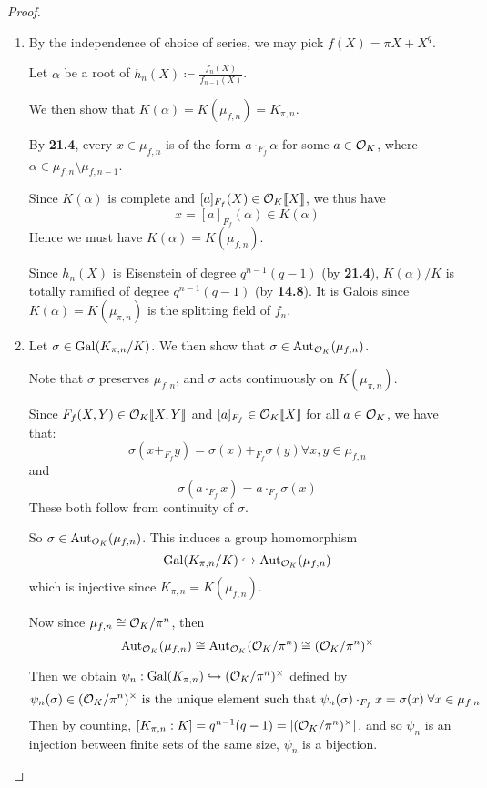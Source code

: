 \documentclass[10pt,a4paper]{article}
\begin{document}
\begin{proof}\hspace*{0cm}
  \begin{enumerate}
    \item By the independence of choice of series, we may pick $f(X) = \pi X + X^q$.

    Let $\alpha$ be a root of $h_n(X) \coloneqq \frac{f_n(X)}{f_{n-1}(X)}$.

    We then show that $K(\alpha) = K(\mu_{f,n}) = K_{\pi,n}$.

    By \textbf{21.4}, every $x \in \mu_{f,n}$ is of the form $a \cdot_{F_f}\alpha$ for some $a \in \mathcal{O}_K$, where $\alpha \in \mu_{f,n}\setminus \mu_{f,n-1}$.

    Since $K(\alpha)$ is complete and $[a]_{F_f}(X) \in \mathcal{O}_K\llbracket X\rrbracket$, we thus have
    \[x = [a]_{F_f}(\alpha) \in K(\alpha)\]
    Hence we must have $K(\alpha) = K(\mu_{f,n})$.

    Since $h_n(X)$ is Eisenstein of degree $q^{n-1}(q-1)$ (by \textbf{21.4}), $K(\alpha)/K$ is totally ramified of degree $q^{n-1}(q-1)$ (by \textbf{14.8}). It is Galois since $K(\alpha) = K(\mu_{\pi,n})$ is the splitting field of $f_n$.

    \item Let $\sigma \in \operatorname{Gal}(K_{\pi,n}/K)$. We then show that $\sigma \in \operatorname{Aut}_{\mathcal{O}_K}(\mu_{f,n})$.

    Note that $\sigma$ preserves $\mu_{f,n}$, and $\sigma$ acts continuously on $K(\mu_{\pi,n})$.

    Since $F_f(X,Y) \in \mathcal{O}_K\llbracket X, Y\rrbracket$ and $[a]_{F_f} \in \mathcal{O}_K\llbracket X\rrbracket$ for all $a \in \mathcal{O}_K$, we have that:
    \[\sigma(x+_{F_f}y) = \sigma(x)+_{F_f} \sigma(y) \forall x, y \in \mu_{f,n}\]
    and
    \[\sigma(a \cdot_{F_f} x) = a\cdot_{F_f} \sigma(x)\]
    These both follow from continuity of $\sigma$.

    So $\sigma \in \operatorname{Aut}_{O_K}(\mu_{f,n})$. This induces a group homomorphism
    \[\operatorname{Gal}(K_{\pi,n}/K) \hookrightarrow \operatorname{Aut}_{\mathcal{O}_K}(\mu_{f,n})\]
    which is injective since $K_{\pi,n} = K(\mu_{f,n})$.

    Now since $\mu_{f,n} \cong \mathcal{O}_K/\pi^n$, then
    \[\operatorname{Aut}_{\mathcal{O}_K}(\mu_{f,n}) \cong \operatorname{Aut}_{\mathcal{O}_K}(\mathcal{O}_K/\pi^n) \cong (\mathcal{O}_K/\pi^n)^\times\]

    Then we obtain $\psi_n : \operatorname{Gal}(K_{\pi,n}) \hookrightarrow (\mathcal{O}_K/\pi^n)^\times$ defined by
    \[\psi_n(\sigma) \in (\O_K/\pi^n)^\times \text{ is the unique element such that }\psi_n(\sigma)\cdot_{F_f}x = \sigma(x) \forall x \in \mu_{f,n}\]
    Then by counting, $[K_{\pi,n}:K] = q^{n-1}(q-1) = |(\mathcal{O}_K/\pi^n)^\times|$, and so $\psi_n$ is an injection between finite sets of the same size, $\psi_n$ is a bijection.


\end{enumerate}
\end{proof}
\end{document}
